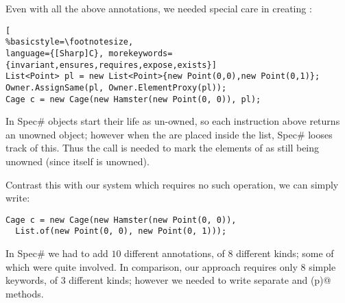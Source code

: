 Even with all the above annotations, we needed special care in creating \Q@Cage@s:%
\begin{lstlisting}[
%basicstyle=\footnotesize,
language={[Sharp]C}, morekeywords={invariant,ensures,requires,expose,exists}]
List<Point> pl = new List<Point>{new Point(0,0),new Point(0,1)};
Owner.AssignSame(pl, Owner.ElementProxy(pl));
Cage c = new Cage(new Hamster(new Point(0, 0)), pl);
\end{lstlisting}

In Spec\# objects start their life as un-owned, so each \Q@new@ instruction above returns an unowned object; however when the \Q@Point@s are placed inside the \Q@pl@ list, Spec\# looses track of this. Thus the \Q@AssignSame@ call is needed to mark the elements of \Q@pl@ as still being unowned (since \Q@pl@ itself is unowned).

Contrast this with our system which requires no such operation, we can simply write:
\begin{lstlisting}
Cage c = new Cage(new Hamster(new Point(0, 0)),
  List.of(new Point(0, 0), new Point(0, 1)));
\end{lstlisting}

In Spec\# we had to add $10$ different annotations, of $8$ different kinds; some of which were quite involved. In comparison, our approach requires only $8$ simple keywords, of $3$ different kinds; however we needed to write 
separate \Q@pos@ and \Q@moveTo(p)@ methods.

